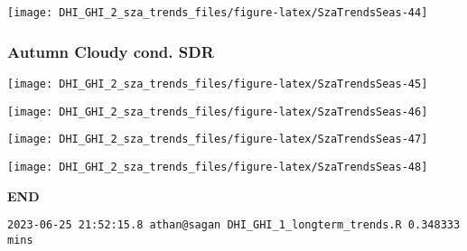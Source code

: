 \documentclass[
  10pt,
  a4paper,oneside]{article}
\begin{document}
\begin{center}\texttt{[image: DHI\_GHI\_2\_sza\_trends\_files/figure-latex/SzaTrendsSeas-44]} \end{center}

\newpage

\hypertarget{autumn-cloudy-cond.-sdr}{%
\subsubsection{Autumn Cloudy cond. SDR}\label{autumn-cloudy-cond.-sdr}}

\begin{center}\texttt{[image: DHI\_GHI\_2\_sza\_trends\_files/figure-latex/SzaTrendsSeas-45]} \end{center}

\begin{center}\texttt{[image: DHI\_GHI\_2\_sza\_trends\_files/figure-latex/SzaTrendsSeas-46]} \end{center}

\begin{center}\texttt{[image: DHI\_GHI\_2\_sza\_trends\_files/figure-latex/SzaTrendsSeas-47]} \end{center}

\begin{center}\texttt{[image: DHI\_GHI\_2\_sza\_trends\_files/figure-latex/SzaTrendsSeas-48]} \end{center}

\textbf{END}

\begin{verbatim}
2023-06-25 21:52:15.8 athan@sagan DHI_GHI_1_longterm_trends.R 0.348333 mins
\end{verbatim}
\end{document}
